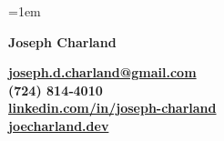 \documentclass[10pt,a4paper]{article}
\begin{document}
\sloppy
{}
\emergencystretch =1em

\noindent
\begin{minipage}[t]{0.60\textwidth}
    {\LARGE \textbf{Joseph Charland}}
\end{minipage}%
\hfill%
\begin{minipage}[t]{0.39\textwidth}\raggedleft
    \textbf{\href{mailto:joseph.d.charland@gmail.com}{joseph.d.charland@gmail.com}\\}
    \textbf{(724) 814‑4010}\\
    \textbf{\href{https://www.linkedin.com/in/joseph-charland/}{linkedin.com/in/joseph-charland}}\\
    \textbf{\href{https://joecharland.dev}{joecharland.dev}}
\end{minipage}

\vspace{0.6cm}
\end{document}
